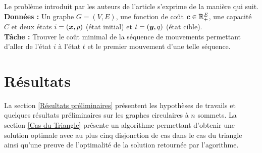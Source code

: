 Le problème introduit par les auteurs de l'article \cite{Benchimol2011} s'exprime de la manière qui suit.
\\
\textbf{Données :} Un graphe $G=(V,E)$, une fonction de coût $\boldsymbol{c} \in \mathbb{R}^E_+$, une capacité $C$ et deux états $i=(\boldsymbol{x},p)$ (état initial) et $t=(\boldsymbol{y},q)$ (état cible).
\\
\textbf{Tâche :} Trouver le coût minimal de la séquence de mouvements permettant d'aller de l'état $i$ à l'état $t$ et le premier mouvement d'une telle séquence.

\section{Résultats}

La section \ref{Résultats préliminaires} présentent les hypothèses de travails et quelques résultats préliminaires sur les graphes circulaires à $n$ sommets. La section \ref{Cas du Triangle} présente un algorithme permettant d'obtenir une solution optimale avec au plus cinq disjonction de cas dans le cas du triangle ainsi qu'une preuve de l'optimalité de la solution retournée par l'agorithme.
